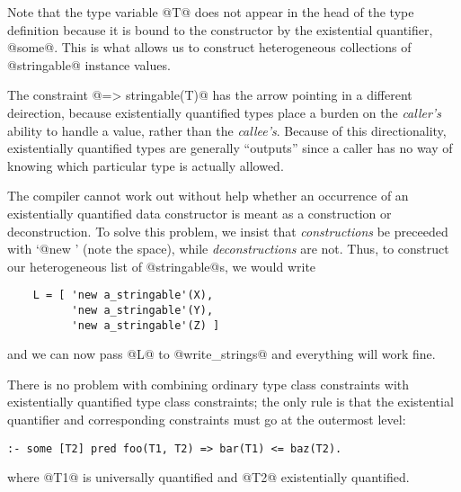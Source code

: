 Note that the type variable @T@ does not appear in the head of the type
definition because it is bound to the constructor by the existential
quantifier, @some@.  This is what allows us to construct heterogeneous
collections of @stringable@ instance values.

The constraint @=> stringable(T)@ has the arrow pointing in a different
deirection, because existentially quantified types place a burden on the
\emph{caller's} ability to handle a value, rather than the
\emph{callee's}.  Because of this directionality, existentially
quantified types are generally ``outputs'' since a caller has no way of
knowing which particular type is actually allowed.

The compiler cannot work out without help  whether an occurrence of an existentially
quantified data constructor is meant as a construction or
deconstruction.  To solve this problem, we insist that
\emph{constructions} be preceeded with `@new ' (note the space), while
\emph{deconstructions} are not.  Thus, to construct our heterogeneous
list of @stringable@s, we would write
\begin{verbatim}
    L = [ 'new a_stringable'(X),
          'new a_stringable'(Y),
          'new a_stringable'(Z) ]
\end{verbatim}
and we can now pass @L@ to @write_strings@ and everything will work
fine.

There is no problem with combining ordinary type class constraints with
existentially quantified type class constraints; the only rule is that
the existential quantifier and corresponding constraints must go at the
outermost level:
\begin{verbatim}
:- some [T2] pred foo(T1, T2) => bar(T1) <= baz(T2).
\end{verbatim}
where @T1@ is universally quantified and @T2@ existentially quantified.
